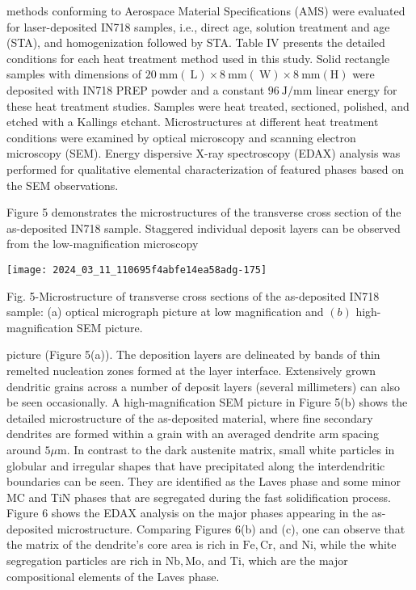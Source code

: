 \documentclass[10pt]{article}
\begin{document}
methods conforming to Aerospace Material Specifications (AMS) were evaluated for laser-deposited IN718 samples, i.e., direct age, solution treatment and age (STA), and homogenization followed by STA. Table IV presents the detailed conditions for each heat treatment method used in this study. Solid rectangle samples with dimensions of $20 \mathrm{~mm}(\mathrm{~L}) \times 8 \mathrm{~mm}(\mathrm{~W}) \times 8 \mathrm{~mm}(\mathrm{H})$ were deposited with IN718 PREP powder and a constant $96 \mathrm{~J} / \mathrm{mm}$ linear energy for these heat treatment studies. Samples were heat treated, sectioned, polished, and etched with a Kallings etchant. Microstructures at different heat treatment conditions were examined by optical microscopy and scanning electron microscopy (SEM). Energy dispersive X-ray spectroscopy (EDAX) analysis was performed for qualitative elemental characterization of featured phases based on the SEM observations.

Figure 5 demonstrates the microstructures of the transverse cross section of the as-deposited IN718 sample. Staggered individual deposit layers can be observed from the low-magnification microscopy

\begin{center}
\texttt{[image: 2024\_03\_11\_110695f4abfe14ea58adg-175]}
\end{center}

Fig. 5-Microstructure of transverse cross sections of the as-deposited IN718 sample: (a) optical micrograph picture at low magnification and $(b)$ high-magnification SEM picture.

picture (Figure 5(a)). The deposition layers are delineated by bands of thin remelted nucleation zones formed at the layer interface. Extensively grown dendritic grains across a number of deposit layers (several millimeters) can also be seen occasionally. A high-magnification SEM picture in Figure 5(b) shows the detailed microstructure of the as-deposited material, where fine secondary dendrites are formed within a grain with an averaged dendrite arm spacing around $5 \mu \mathrm{m}$. In contrast to the dark austenite matrix, small white particles in globular and irregular shapes that have precipitated along the interdendritic boundaries can be seen. They are identified as the Laves phase and some minor MC and TiN phases that are segregated during the fast solidification process. Figure 6 shows the EDAX analysis on the major phases appearing in the as-deposited microstructure. Comparing Figures 6(b) and (c), one can observe that the matrix of the dendrite's core area is rich in $\mathrm{Fe}, \mathrm{Cr}$, and $\mathrm{Ni}$, while the white segregation particles are rich in $\mathrm{Nb}, \mathrm{Mo}$, and $\mathrm{Ti}$, which are the major compositional elements of the Laves phase.
\end{document}
